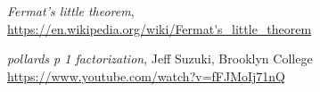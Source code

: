 \documentclass[10pt]{article}
\begin{document}
\newpage
\begin{thebibliography}{9}
	\textit{Fermat's little theorem},\\
	\url{https://en.wikipedia.org/wiki/Fermat's_little_theorem}
	
	\textit{pollards p 1 factorization}, Jeff Suzuki, Brooklyn College\\
	\url{https://www.youtube.com/watch?v=fFJMoIj71nQ}
\end{thebibliography}
\end{document}
